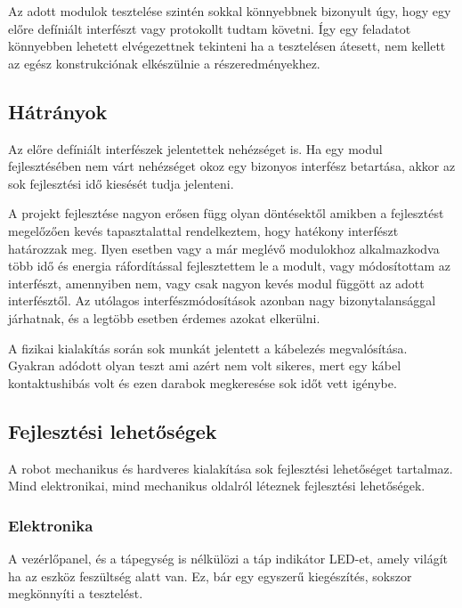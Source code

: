 \medskip

Az adott modulok tesztelése szintén sokkal könnyebbnek bizonyult úgy, hogy egy
előre defíniált interfészt vagy protokollt tudtam követni. Így egy feladatot
könnyebben lehetett elvégezettnek tekinteni ha a tesztelésen átesett, nem kellett
az egész konstrukciónak elkészülnie a részeredményekhez. 

\subsection{Hátrányok}

Az előre defíniált interfészek jelentettek nehézséget is. Ha egy modul
fejlesztésében nem várt nehézséget okoz egy bizonyos interfész betartása, akkor
az sok fejlesztési idő kiesését tudja jelenteni.

A projekt fejlesztése nagyon erősen függ olyan döntésektől amikben a fejlesztést
megelőzően kevés tapasztalattal rendelkeztem, hogy hatékony interfészt határozzak
meg. Ilyen esetben vagy a már meglévő modulokhoz alkalmazkodva több idő és
energia ráfordítással fejlesztettem le a modult, vagy módosítottam az interfészt,
amennyiben nem, vagy csak nagyon kevés modul függött az adott interfésztől. Az
utólagos interfészmódosítások azonban nagy bizonytalansággal járhatnak, és a
legtöbb esetben érdemes azokat elkerülni.

\medskip

A fizikai kialakítás során sok munkát jelentett a kábelezés megvalósítása.
Gyakran adódott olyan teszt ami azért nem volt sikeres, mert egy kábel
kontaktushibás volt és ezen darabok megkeresése sok időt vett igénybe.

\subsection{Fejlesztési lehetőségek}

A robot mechanikus és hardveres kialakítása sok fejlesztési lehetőséget
tartalmaz. Mind elektronikai, mind mechanikus oldalról léteznek fejlesztési
lehetőségek.

\subsubsection{Elektronika}

A vezérlőpanel, és a tápegység is nélkülözi a táp indikátor LED-et, amely világít
ha az eszköz feszültség alatt van. Ez, bár egy egyszerű kiegészítés, sokszor
megkönnyíti a tesztelést.

